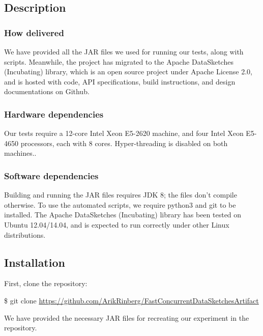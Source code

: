 \subsection{Description}

\subsubsection{How delivered}

We have provided all the JAR files we used for running our tests, along with scripts. Meanwhile, the project
has migrated to the Apache DataSketches (Incubating) library, which is an open source project
under Apache License 2.0, and is hosted with code, API specifications,
build instructions, and design documentations on Github.

\subsubsection{Hardware dependencies}
Our tests require a 12-core Intel Xeon E5-2620 machine, and four Intel
Xeon E5-4650 processors, each with $8$ cores. Hyper-threading is disabled on both machines..

\subsubsection{Software dependencies}
Building and running the JAR files requires JDK 8; the files
don't compile otherwise. To use the automated scripts,
we require python3 and git to be installed. The Apache DataSketches (Incubating) library 
has been tested on Ubuntu 12.04/14.04, and is expected to run correctly under other Linux distributions.


\subsection{Installation}


First, clone the repository:

\begin{framed}

\$ git clone \url{https://github.com/ArikRinberg/FastConcurrentDataSketchesArtifact}

\end{framed}

\noindent We have provided the necessary JAR files for recreating our experiment in the repository.


